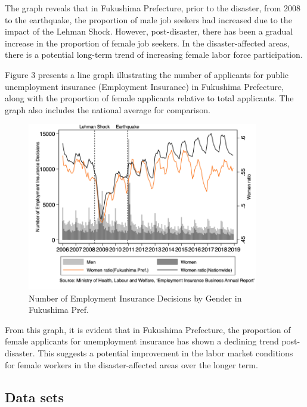 \documentclass[12pt,halfline,a4paper]{ouparticle}
\begin{document}
The graph reveals that in Fukushima Prefecture, prior to the disaster, from 2008 to the earthquake, the proportion of male job seekers had increased due to the impact of the Lehman Shock. However, post-disaster, there has been a gradual increase in the proportion of female job seekers. In the disaster-affected areas, there is a potential long-term trend of increasing female labor force participation.

\newpage


Figure 3 presents a line graph illustrating the number of applicants for public unemployment insurance (Employment Insurance) in Fukushima Prefecture, along with the proportion of female applicants relative to total applicants. The graph also includes the national average for comparison. 

\begin{figure}[h!]
    \centering
    \includegraphics[width=0.9\textwidth]{Number of Employment Insurance Decisions_2.png}  %
    \caption{Number of Employment Insurance Decisions by Gender in Fukushima Pref.}
    \label{fig:employment_insurance_decisions}
\end{figure}

From this graph, it is evident that in Fukushima Prefecture, the proportion of female applicants for unemployment insurance has shown a declining trend post-disaster. This suggests a potential improvement in the labor market conditions for female workers in the disaster-affected areas over the longer term.


\subsection{Data sets}
\label{sec5.1}
\end{document}
